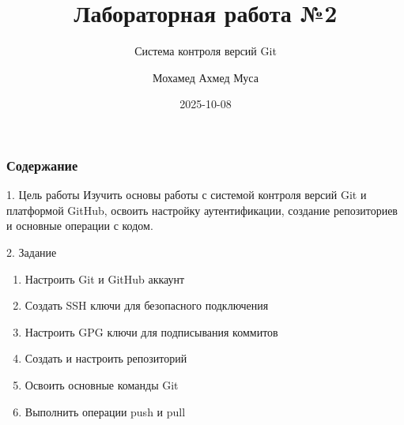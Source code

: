\documentclass[
  ignorenonframetext,
  aspectratio=169,
]{beamer}
\title{Лабораторная работа №2}
\subtitle{Система контроля версий Git}
\author{Мохамед Ахмед Муса}
\date{2025-10-08}
\providecommand{\tightlist}{%
  \setlength{\itemsep}{0pt}\setlength{\parskip}{0pt}}\usepackage{longtable,booktabs,array}
\renewcommand*\contentsname{Содержание}
\newcommand\contentsname{Содержание}
\begin{document}
\frame{\titlepage}

\renewcommand*\contentsname{Содержание}
\begin{frame}[allowframebreaks]
  \frametitle{Содержание}
  \tableofcontents[hideallsubsections]
\end{frame}
\begin{frame}{1. Цель работы}
\label{ux446ux435ux43bux44c-ux440ux430ux431ux43eux442ux44b}
Изучить основы работы с системой контроля версий Git и платформой
GitHub, освоить настройку аутентификации, создание репозиториев и
основные операции с кодом.
\end{frame}

\begin{frame}{2. Задание}
\label{ux437ux430ux434ux430ux43dux438ux435}
\begin{enumerate}[<+->]
\tightlist
\item
  Настроить Git и GitHub аккаунт
\item
  Создать SSH ключи для безопасного подключения
\item
  Настроить GPG ключи для подписывания коммитов
\item
  Создать и настроить репозиторий
\item
  Освоить основные команды Git
\item
  Выполнить операции push и pull
\end{enumerate}
\end{frame}
\end{document}
